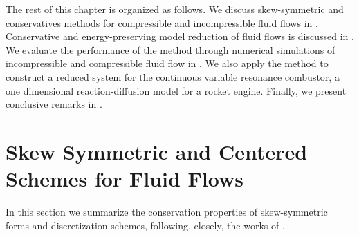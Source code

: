 The rest of this chapter is organized as follows. We discuss skew-symmetric and conservatives methods for compressible and incompressible fluid flows in . Conservative and energy-preserving model reduction of fluid flows is discussed in . We evaluate the performance of the method through numerical simulations of incompressible and compressible fluid flow in . We also apply the method to construct a reduced system for the continuous variable resonance combustor, a one dimensional reaction-diffusion model for a rocket engine. Finally, we present conclusive remarks in .

\section{Skew Symmetric and Centered Schemes for Fluid Flows} \label{p4.sec:skew}

In this section we summarize the conservation properties of skew-symmetric forms and discretization schemes, following, closely, the works of \cite{morinishi2010skew,morinishi1998fully,tadmor1984skew,reiss2014conservative}.

